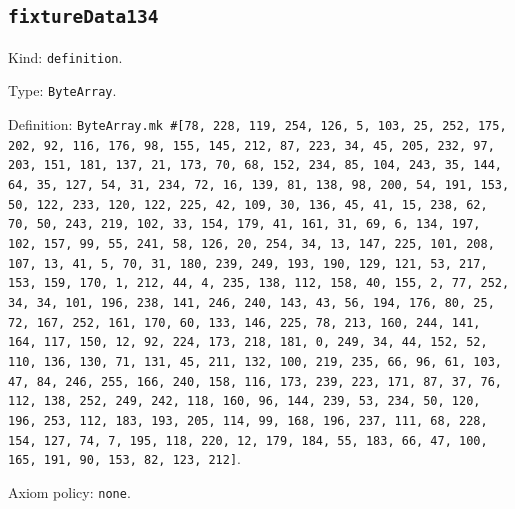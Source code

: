 \documentclass[11pt]{article}
\begin{document}
\subsection*{\texttt{fixtureData134}}
\noindent Kind: \texttt{definition}.\par
\noindent Type: \texttt{ByteArray}.\par
\noindent Definition: \texttt{ByteArray.mk \#[78, 228, 119, 254, 126, 5, 103, 25, 252, 175, 202, 92, 116, 176, 98, 155, 145, 212, 87, 223, 34, 45, 205, 232, 97, 203, 151, 181, 137, 21, 173, 70, 68, 152, 234, 85, 104, 243, 35, 144, 64, 35, 127, 54, 31, 234, 72, 16, 139, 81, 138, 98, 200, 54, 191, 153, 50, 122, 233, 120, 122, 225, 42, 109, 30, 136, 45, 41, 15, 238, 62, 70, 50, 243, 219, 102, 33, 154, 179, 41, 161, 31, 69, 6, 134, 197, 102, 157, 99, 55, 241, 58, 126, 20, 254, 34, 13, 147, 225, 101, 208, 107, 13, 41, 5, 70, 31, 180, 239, 249, 193, 190, 129, 121, 53, 217, 153, 159, 170, 1, 212, 44, 4, 235, 138, 112, 158, 40, 155, 2, 77, 252, 34, 34, 101, 196, 238, 141, 246, 240, 143, 43, 56, 194, 176, 80, 25, 72, 167, 252, 161, 170, 60, 133, 146, 225, 78, 213, 160, 244, 141, 164, 117, 150, 12, 92, 224, 173, 218, 181, 0, 249, 34, 44, 152, 52, 110, 136, 130, 71, 131, 45, 211, 132, 100, 219, 235, 66, 96, 61, 103, 47, 84, 246, 255, 166, 240, 158, 116, 173, 239, 223, 171, 87, 37, 76, 112, 138, 252, 249, 242, 118, 160, 96, 144, 239, 53, 234, 50, 120, 196, 253, 112, 183, 193, 205, 114, 99, 168, 196, 237, 111, 68, 228, 154, 127, 74, 7, 195, 118, 220, 12, 179, 184, 55, 183, 66, 47, 100, 165, 191, 90, 153, 82, 123, 212]}.\par
\noindent Axiom policy: \texttt{none}.\par
\end{document}
